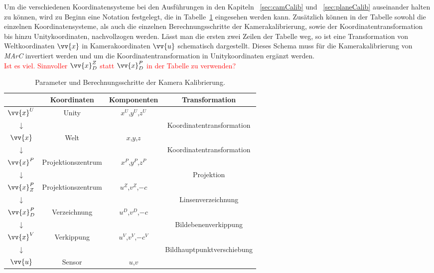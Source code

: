 Um die verschiedenen Koordinatensysteme bei den Ausführungen in den Kapiteln ~\ref{sec:camCalib} und ~\ref{sec:planeCalib} auseinander halten zu können, wird zu Beginn eine Notation festgelegt, die in Tabelle~\ref{tab:camCalibParam} eingesehen werden kann. Zusätzlich können in der Tabelle sowohl die einzelnen Koordinatensysteme, als auch die einzelnen Berechnungsschritte der Kamerakalibrierung, sowie der Koordinatentransformation bis hinzu Unitykoordinaten, nachvollzogen werden. Lässt man die ersten zwei Zeilen der Tabelle weg, so ist eine Transformation von Weltkoordinaten $\vv{x}$ in Kamerakoordinaten $\vv{u}$ schematisch dargestellt. Dieses Schema muss für die Kamerakalibrierung von \textit{MArC} invertiert werden und um die Koordinatentransformation in Unitykoordinaten ergänzt werden.\\

\textcolor{red}{Ist es viel. Sinnvoller $\vv{x}^Z_D$ statt $\vv{x}^P_D$ in der Tabelle zu verwenden?} 

\begin{table}
	\centering
	\renewcommand{\arraystretch}{1.4}
	\begin{tabular}{|c|c|c|c|}
		\hline
		\Absatzbox{}
		& \textbf{Koordinaten} & \textbf{Komponenten}&\textbf{Transformation}\\
		\hline
		$\vv{x}^U$ & Unity &$x^U$,$y^U$,$z^U$& \\
		\cline{2-4}
		$\downarrow$ & & & Koordinatentransformation\\
		\cline{2-4}
		$\vv{x}$ & Welt &$x$,$y$,$z$&  \\
		\cline{2-4}
		$\downarrow$ & & & Koordinatentransformation\\
		\cline{2-4}
		$\vv{x}^P$ & Projektionszentrum &$x^P$,$y^P$,$z^P$& \\
		\cline{2-4}
		$\downarrow$ & & & Projektion \\
		\cline{2-4}
		$\vv{x}^P_Z$ & Projektionszentrum &$u^Z$,$v^Z$,$-c$& \\
		\cline{2-4}
		$\downarrow$ & & & Linsenverzeichnung\\
		\cline{2-4}	
		$\vv{x}^P_D$ & Verzeichnung &$u^D$,$v^D$,$-c$& \\
		\cline{2-4}
		$\downarrow$ & & & Bildebenenverkippung\\
		\cline{2-4}		
		$\vv{x}^V$ &Verkippung &$u^V$,$v^V$,$-c^V$& \\
		\cline{2-4}
		$\downarrow$ & & & Bildhauptpunktverschiebung\\
		\cline{2-4}	
		$\vv{u}$ & Sensor &$u$,$v$ & \\
		\hline
	\end{tabular}
	\caption{Parameter und Berechnungsschritte der Kamera Kalibrierung.\cite{Meisel:77890}}
	\label{tab:camCalibParam}
\end{table}


